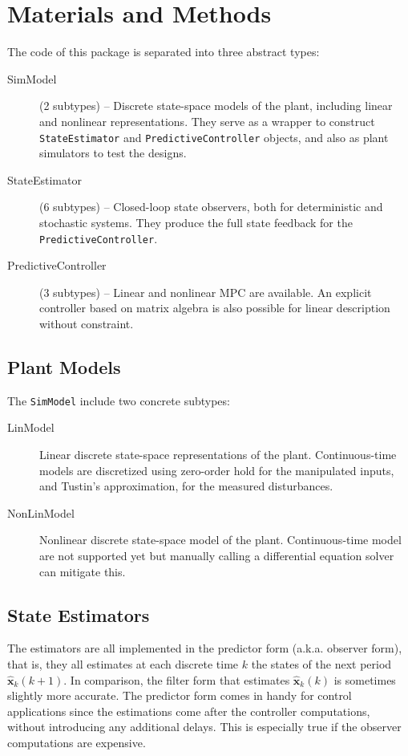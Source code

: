 
\section{Materials and Methods}

The code of this package is separated into three abstract types:
\begin{description}
    \item[SimModel] (2 subtypes) -- Discrete state-space models of the plant, including linear and nonlinear representations. They serve as a wrapper to construct \texttt{StateEstimator} and \texttt{PredictiveController} objects, and also as plant simulators to test the designs.
    \item[StateEstimator] (6 subtypes) -- Closed-loop state observers, both for deterministic and stochastic systems. They produce the full state feedback for the \texttt{PredictiveController}.
    \item[PredictiveController] (3 subtypes) -- Linear and nonlinear MPC are available. An explicit controller based on matrix algebra is also possible for linear description without constraint.
\end{description}

\subsection{Plant Models}

The \texttt{SimModel} include two concrete subtypes:
\begin{description}
    \item[LinModel] Linear discrete state-space representations of the plant. Continuous-time models are discretized using zero-order hold for the manipulated inputs, and Tustin's approximation, for the measured disturbances.
    \item[NonLinModel] Nonlinear discrete state-space model of the plant. Continuous-time model are not supported yet but manually calling a differential equation solver can mitigate this.
\end{description}

\subsection{State Estimators}

The estimators are all implemented in the predictor form (a.k.a. observer form), that is, they all estimates at each discrete time $k$ the states of the next period $\mathbf{\hat{x}}_k(k+1)$. In comparison, the filter form that estimates $\mathbf{\hat{x}}_k(k)$ is sometimes slightly more accurate. The predictor form comes in handy for control applications since the estimations come after the controller computations, without introducing any additional delays. This is especially true if the observer computations are expensive.

